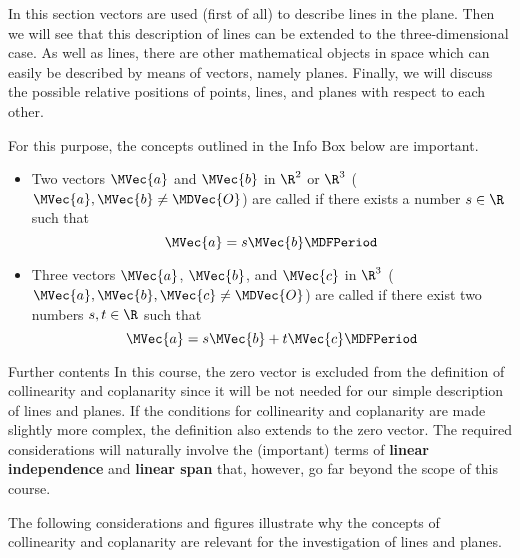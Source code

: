 \begin{MIntro}

In this section vectors are used (first of all) to describe lines in the plane. Then we will see that 
this description of lines can be extended to the three-dimensional case. As well as lines, there are other mathematical objects in space which can easily be 
described by means of vectors, namely planes. Finally, we will discuss the possible relative positions of points, 
lines, and planes with respect to each other.
 
For this purpose, the concepts outlined in the Info Box below are important.

\begin{MInfo}
\begin{itemize}
 \item Two vectors $\MVec{a}$ and $\MVec{b}$ in $\R^2$ or $\R^3$ ($\MVec{a},\MVec{b}\neq\MDVec{O}$) are called 
   if there exists a number $s\in\R$ such that
 \[
  \MVec{a}=s\MVec{b}\MDFPeriod
 \]
 \item Three vectors $\MVec{a}$, $\MVec{b}$, and $\MVec{c}$ in $\R^3$ ($\MVec{a},\MVec{b},\MVec{c}\neq\MDVec{O}$) 
  are called  if there exist two numbers $s,t\in\R$ such that
 \[
  \MVec{a}=s\MVec{b}+t\MVec{c}\MDFPeriod
 \]
\end{itemize}
\end{MInfo}

\begin{MHint}{Further contents}
In this course, the zero vector is excluded from the definition of collinearity and coplanarity
since it will be not needed for our simple description of lines and planes. If the conditions 
for collinearity and coplanarity are made slightly more complex, the definition also extends 
to the zero vector. The required considerations will naturally involve the (important) terms of 
\textbf{linear independence} and \textbf{linear span} that, however, go far beyond the scope of this 
course. 
\end{MHint}

The following considerations and figures illustrate why the concepts of collinearity and coplanarity
are relevant for the investigation of lines and planes.


\end{MIntro}
